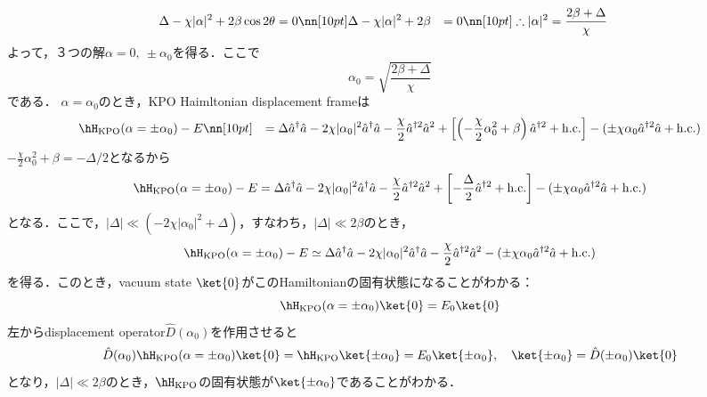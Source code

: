 \begin{align}
    \Delta- \chi|\alpha|^2
    +2\beta\cos{2\theta}&=0\nn[10pt]
    \Delta- \chi|\alpha|^2
    +2\beta&=0\nn[10pt]
    \therefore
    |\alpha|^2
    &=\frac{2\beta+\Delta}{\chi}
\end{align}
よって，３つの解$\alpha=0,\ \pm\alpha_0$を得る．ここで
\begin{equation}
    \alpha_0 = \sqrt{\frac{2\beta+\Delta}{\chi}}
\end{equation}
である．
$\alpha=\alpha_0$のとき，KPO Haimltonian displacement frameは
\begin{align}
    &\hH_{\rm{KPO}}(\alpha=\pm\alpha_0)-E\nn[10pt]
    &=\Delta\hat{a}^{\dagger}\hat{a} 
    - 2\chi|\alpha_0|^2\hat{a}^{\dagger}\hat{a}
    - \frac{\chi}{2}\hat{a}^{\dagger2}\hat{a}^2
    +\left[\left(- \frac{\chi}{2}\alpha_0^2+\beta\right)\hat{a}^{\dagger2}
    +{\rm{h.c.}}\right]
    - (\pm\chi\alpha_0\hat{a}^{\dagger2}\hat{a} +{\rm{h.c.}} )
\end{align}
$- \frac{\chi}{2}\alpha_0^2+\beta=-\Delta/2$となるから
\begin{equation}
    \hH_{\rm{KPO}}(\alpha=\pm\alpha_0) - E
    =
    \Delta\hat{a}^{\dagger}\hat{a} 
    - 2\chi|\alpha_0|^2\hat{a}^{\dagger}\hat{a}
    - \frac{\chi}{2}\hat{a}^{\dagger2}\hat{a}^2
    +\left[- \frac{\Delta}{2}\hat{a}^{\dagger2}
    +{\rm{h.c.}}\right]
    - (\pm\chi\alpha_0\hat{a}^{\dagger2}\hat{a} +{\rm{h.c.}} )
\end{equation}
となる．ここで，$|\Delta|\ll (-2\chi|\alpha_0|^2+\Delta)$，すなわち，$|\Delta|\ll 2\beta$のとき，
\begin{equation}
    \hH_{\rm{KPO}}(\alpha=\pm\alpha_0) - E
    \simeq
    \Delta\hat{a}^{\dagger}\hat{a} 
    - 2\chi|\alpha_0|^2\hat{a}^{\dagger}\hat{a}
    - \frac{\chi}{2}\hat{a}^{\dagger2}\hat{a}^2
    - (\pm\chi\alpha_0\hat{a}^{\dagger2}\hat{a} +{\rm{h.c.}} )
\end{equation}
を得る．このとき，vacuum state $\ket{0}$がこのHamiltonianの固有状態になることがわかる：
\begin{equation}
    \hH_{\rm{KPO}}(\alpha=\pm\alpha_0)\ket{0}
    =E_0\ket{0}
\end{equation}
左からdisplacement operator$\hat{D}(\alpha_0)$を作用させると
\begin{equation}
    \hat{D}(\alpha_0)\hH_{\rm{KPO}}(\alpha=\pm\alpha_0)\ket{0}
    =\hH_{\rm{KPO}}\ket{\pm\alpha_0}
    =E_0\ket{\pm\alpha_0},\ \ \ \ket{\pm\alpha_0}=\hat{D}(\pm\alpha_0)\ket{0}
\end{equation}
となり，$|\Delta|\ll 2\beta$のとき，$\hH_{\rm{KPO}}$の固有状態が$\ket{\pm\alpha_0}$であることがわかる．


